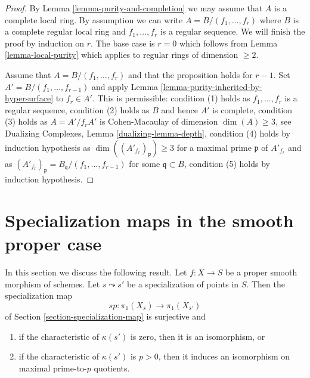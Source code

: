 \begin{proof}
By Lemma \ref{lemma-purity-and-completion} we may assume that $A$ is
a complete local ring. By assumption we can write
$A = B/(f_1, \ldots, f_r)$ where $B$ is a complete regular local
ring and $f_1, \ldots, f_r$ is a regular sequence.
We will finish the proof by induction on $r$.
The base case is $r = 0$ which follows from
Lemma \ref{lemma-local-purity} which applies to
regular rings of dimension $\geq 2$.

\medskip\noindent
Assume that $A = B/(f_1, \ldots, f_r)$ and that the proposition
holds for $r - 1$. Set $A' = B/(f_1, \ldots, f_{r - 1})$ and apply
Lemma \ref{lemma-purity-inherited-by-hypersurface} to $f_r \in A'$.
This is permissible:
condition (1) holds as $f_1, \ldots, f_r$ is a regular sequence,
condition (2) holds as $B$ and hence $A'$ is complete,
condition (3) holds as $A = A'/f_r A'$ is Cohen-Macaulay of dimension
$\dim(A) \geq 3$, see Dualizing Complexes, Lemma \ref{dualizing-lemma-depth},
condition (4) holds by induction hypothesis as
$\dim((A'_{f_r})_\mathfrak p) \geq 3$ for a maximal
prime $\mathfrak p$ of $A'_{f_r}$ and as
$(A'_{f_r})_\mathfrak p = B_\mathfrak q/(f_1, \ldots, f_{r - 1})$
for some $\mathfrak q \subset B$,
condition (5) holds by induction hypothesis.
\end{proof}






\section{Specialization maps in the smooth proper case}
\label{section-specialization-smooth-proper}

\noindent
In this section we discuss the following result.
Let $f : X \to S$ be a proper smooth morphism of schemes.
Let $s \leadsto s'$ be a specialization of points in $S$.
Then the specialization map
$$
sp : \pi_1(X_{\overline{s}}) \longrightarrow \pi_1(X_{\overline{s}'})
$$
of Section \ref{section-specialization-map}
is surjective and
\begin{enumerate}
\item if the characteristic of $\kappa(s')$ is zero, then it is
an isomorphism, or
\item if the characteristic of $\kappa(s')$ is $p > 0$, then it
induces an isomorphism on maximal prime-to-$p$ quotients.
\end{enumerate}







